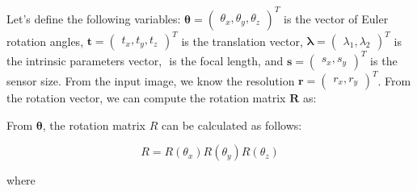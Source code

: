 Let's define the following variables: \(\boldsymbol{\theta} = \begin{pmatrix}
	\theta_x, \theta_y, \theta_z
\end{pmatrix}^{T}\) is the vector of Euler rotation angles, \(\mathbf{t} = \begin{pmatrix}
	t_x, t_y, t_z
\end{pmatrix}^{T}\) is the translation vector, \(\boldsymbol{\lambda} = \begin{pmatrix}
	\lambda_1, \lambda_2
\end{pmatrix}^{T}\) is the intrinsic parameters vector, \(\) is the focal
length, and \(\mathbf{s} = \begin{pmatrix}
	s_x, s_y
\end{pmatrix}^{T}\) is the sensor size.
From the input image, we know the resolution \(\mathbf{r} = \begin{pmatrix}
	r_x, r_y
\end{pmatrix}^{T}\).
From the rotation vector, we can compute the rotation matrix \(\mathbf{R}\) as:

From \(\boldsymbol{\theta}\), the rotation matrix $R$ can be calculated as follows:

\begin{equation}
	R = R(\theta_x) R(\theta_y) R(\theta_z)
\end{equation} 

where

